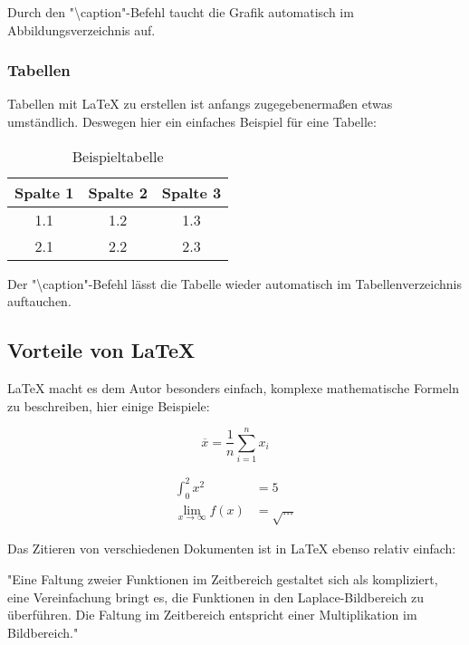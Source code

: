 Durch den "\textbackslash{}caption"-Befehl taucht die Grafik automatisch im Abbildungsverzeichnis auf.

\subsubsection{Tabellen}

Tabellen mit \LaTeX{} zu erstellen ist anfangs zugegebenermaßen etwas umständlich. Deswegen hier ein einfaches
Beispiel für eine Tabelle:


\begin{table}[H]
  \centering
  \begin{tabular}{|c|c|c|}
    \hline
    Spalte 1 & Spalte 2 & Spalte 3 \\
    \hline
    1.1 & 1.2 & 1.3 \\
    2.1 & 2.2 & 2.3 \\
    \hline
  \end{tabular}
  \caption{Beispieltabelle}
  \label{tab: Beispieltabelle}
\end{table}

Der "\textbackslash{}caption"-Befehl lässt die Tabelle wieder automatisch im Tabellenverzeichnis auftauchen.



\subsection{Vorteile von \LaTeX}

\LaTeX{} macht es dem Autor besonders einfach, komplexe mathematische Formeln zu beschreiben, hier einige
Beispiele:

\begin{equation}
  \overline{x} = \frac{1}{n} \sum_{i=1}^n x_i
\end{equation}

\begin{align*}
  \int_0^2 x^2 &= 5 \\
  \lim_{x\to\infty} f(x) &= \sqrt{\ldots}
\end{align*}

Das Zitieren von verschiedenen Dokumenten ist in \LaTeX{} ebenso relativ einfach:

"Eine Faltung zweier Funktionen im Zeitbereich gestaltet sich als kompliziert, eine Vereinfachung
bringt es, die Funktionen in den Laplace-Bildbereich zu überführen.
Die Faltung im Zeitbereich entspricht einer Multiplikation im Bildbereich." \cite[S. 339f]{Papula2006}


